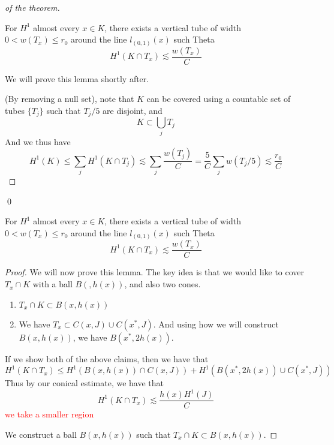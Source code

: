 \begin{proof}[of the theorem]
    \begin{lemma}
        For $H^1$ almost every $x\in K$, there exists a vertical tube of width $0<w(T_x)\leq r_0$ around the line $l_{(0,1)}(x)$ such Theta
        \begin{equation*}
            H^1(K\cap T_x)\lesssim \frac{w(T_x)}{C}
        \end{equation*}
    \end{lemma}
    \begin{note}
        We will prove this lemma shortly after.
    \end{note}
    (By removing a null set), note that $K$ can be covered using a countable set of tubes $\{T_j\}$ such that $T_j/5$ are disjoint, and
    \begin{equation*}
        K\subset\bigcup_j T_j
    \end{equation*}
    And we thus have
    \begin{equation*}
        H^1(K)\leq \sum_j H^1(K\cap T_j)\lesssim\sum_j\frac{w(T_j)}{C}=\frac{5}{C}\sum_jw(T_j/5)\lesssim \frac{r_0}{C}
    \end{equation*}
\end{proof}
\qed

\begin{lemma}
        For $H^1$ almost every $x\in K$, there exists a vertical tube of width $0<w(T_x)\leq r_0$ around the line $l_{(0,1)}(x)$ such Theta
        \begin{equation*}
            H^1(K\cap T_x)\lesssim \frac{w(T_x)}{C}
        \end{equation*}
\end{lemma}
\begin{proof}
    We will now prove this lemma. The key idea is that we would like to cover $T_x\cap K$ with a ball $B(, h(x))$, and also two cones.
    \begin{enumerate}
        \item $T_x\cap K\subset B(x,h(x))$
        \item We have $T_x\subset C(x,J)\cup C(x^*, J)$. And using how we will construct $B(x, h(x))$, we have $B(x^*, 2h(x))$.
    \end{enumerate}
    If we show both of the above claims, then we have that 
    \begin{equation*}
        H^1(K\cap T_x)\leq H^1(B(x,h(x))\cap C(x,J))+H^1(B(x^*, 2h(x))\cup C(x^*, J))
    \end{equation*}
    Thus by our conical estimate, we have that
    \begin{equation*}
        H^1(K\cap T_x)\lesssim \frac{h(x)H^1(J)}{C}
    \end{equation*}
    \textcolor{red}{we take a smaller region} 

    We construct a ball $B(x,h(x))$ such that $T_x\cap K\subset B(x, h(x))$.
\end{proof}







